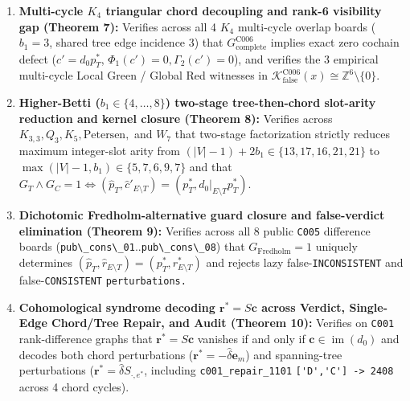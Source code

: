 \documentclass[
  11pt,
]{article}
\newcommand{\passthrough}[1]{#1}
\begin{document}
\begin{enumerate}
  \(\emptyset\).
\item
  \textbf{Multi-cycle \(K_4\) triangular chord decoupling and rank-6
  visibility gap (Theorem 7):} Verifies across all 4 \(K_4\) multi-cycle
  overlap boards (\(b_1 = 3\), shared tree edge incidence 3) that
  \(G_{\text{complete}}^{\text{C006}}\) implies exact zero cochain
  defect (\(c' = d_0 p_T^*\),
  \(\Phi_1(c') = 0,\allowbreak  \Gamma_2(c') = 0\)), and verifies the 3
  empirical multi-cycle Local Green / Global Red witnesses in
  \(\mathcal{K}_{\text{false}}^{\text{C006}}(x) \cong \mathbb{Z}^6 \setminus \{0\}\).
\item
  \textbf{Higher-Betti
  (\(b_1 \in \{4,\allowbreak  \dots,\allowbreak  8\}\)) two-stage
  tree-then-chord slot-arity reduction and kernel closure (Theorem 8):}
  Verifies across
  \(K_{3,\allowbreak 3},\allowbreak  Q_3,\allowbreak  K_5,\allowbreak  \text{Petersen},\allowbreak \)
  and \(W_7\) that two-stage factorization strictly reduces maximum
  integer-slot arity from
  \((|V|-1)+2 b_1 \in \{13,\allowbreak  17,\allowbreak  16,\allowbreak  21,\allowbreak  21\}\)
  to
  \(\max(|V|-1,\allowbreak  b_1) \in \{5,\allowbreak  7,\allowbreak  6,\allowbreak  9,\allowbreak  7\}\)
  and that
  \(G_T \wedge G_C = 1 \iff (\hat{p}_T,\allowbreak  \hat{c}'_{E \setminus T}) = (p_T^*,\allowbreak  d_0|_{E \setminus T} p_T^*)\).
\item
  \textbf{Dichotomic Fredholm-alternative guard closure and
  false-verdict elimination (Theorem 9):} Verifies across all 8 public
  \passthrough{\lstinline!C005!} difference boards
  (\passthrough{\lstinline!pub\_cons\_01!}..\passthrough{\lstinline!pub\_cons\_08!})
  that \(G_{\text{Fredholm}} = 1\) uniquely determines
  \((\hat{p}_T,\allowbreak  \hat{r}_{E \setminus T}) = (p_T^*,\allowbreak  r_{E \setminus T}^*)\)
  and rejects lazy false-\passthrough{\lstinline!INCONSISTENT!} and
  false-\passthrough{\lstinline!CONSISTENT!} \nolinkurl{perturbations.}
\item
  \textbf{Cohomological syndrome decoding \(\mathbf{r}^* = S\mathbf{c}\)
  across Verdict, Single-Edge Chord/Tree Repair, and Audit (Theorem
  10):} Verifies on \passthrough{\lstinline!C001!} rank-difference
  graphs that \(\mathbf{r}^* = S\mathbf{c}\) vanishes if and only if
  \(\mathbf{c} \in \operatorname{im}(d_0)\) and decodes both chord
  perturbations (\(\mathbf{r}^* = -\hat{\delta}\mathbf{e}_m\)) and
  spanning-tree perturbations
  (\(\mathbf{r}^* = \hat{\delta} S_{\cdot,\allowbreak  e^*}\), including
  \nolinkurl{c001_repair_1101}
  \passthrough{\lstinline!['D','C'] -> 2408!} across 4 chord cycles).

\end{enumerate}
\end{document}
